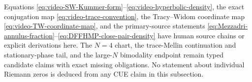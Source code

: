 \begin{remark}
Equations \eqref{eq:video-SW-Kummer-form}--\eqref{eq:video-hyperbolic-density}, the exact
conjugation map \eqref{eq:video-trace-convention}, the Tracy--Widom coordinate map
\eqref{eq:video-TW-coordinate-map}, and the primary-source statements
\eqref{eq:Mezzadri-annulus-fraction}--\eqref{eq:DFFHMP-close-pair-density} have human
source chains or explicit derivations here.  The $N=4$ chart, the trace-Mellin continuation
and stationary-phase tail, and the large-$N$ bimodality endpoint remain typed candidate
claims with exact missing obligations.  No statement about individual Riemann zeros is
deduced from any CUE claim in this subsection.
\end{remark}
